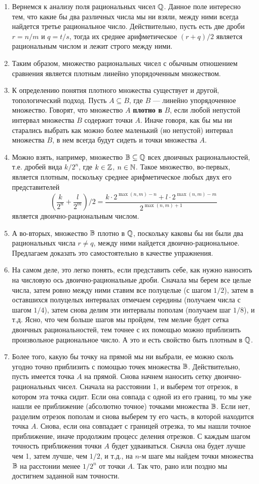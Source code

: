 \begin{enumerate}
\item Вернемся к анализу поля рациональных чисел $\mathbb Q$. Данное поле интересно тем, что какие бы два различных числа мы ни взяли, между ними всегда найдется третье рациональное число. Действительно, пусть есть две дроби $r=n/m$ и $q=t/s$, тогда их среднее арифметическое $(r+q)/2$ является рациональным числом и лежит строго между ними.
\item Таким образом, множество рациональных чисел с обычным отношением сравнения является плотным линейно упорядоченным множеством.
\item К определению понятия плотного множества существует и другой, топологический подход. Пусть $A\subseteq B$, где $B$ --- линейно упорядоченное множество. Говорят, что множество $A$ \textbf{плотно в} $B$, если любой непустой интервал множества $B$ содержит точки $A$. Иначе говоря, как бы мы ни старались выбрать как можно более маленький (но непустой) интервал множества $B$, в нем всегда будут сидеть и точки множества $A$.
\item Можно взять, например, множество $\mathbb B\subseteq\mathbb Q$ всех двоичных рациональностей, т.е. дробей вида $k/2^n$, где $k\in\mathbb Z$, $n\in\mathbb N$. Такое множество, во-первых, является плотным, поскольку среднее арифметическое любых двух его представителей
$$
\left(\frac{k}{2^n}+\frac{l}{2^m}\right)/2 = \frac{k\cdot 2^{\max(n,m)-n}+l\cdot 2^{\max(n,m)-m}}{2^{\max(n,m)+1}}
$$
является двоично-рациональным числом.
\item А во-вторых, множество $\mathbb B$ плотно в $\mathbb Q$, поскольку каковы бы ни были два рациональных числа $r\ne q$, между ними найдется двоично-рациональное. Предлагаем доказать это самостоятельно в качестве упражнения.
\item На самом деле, это легко понять, если представить себе, как нужно наносить на числовую ось двоично-рациональные дроби. Сначала мы берем все целые числа, затем ровно между ними ставим все полуцелые (с шагом $1/2$), затем в оставшихся полуцелых интервалах отмечаем середины (получаем числа с шагом $1/4$), затем снова делим эти интервалы пополам (получаем шаг $1/8$), и т.д. Ясно, что чем больше шагов мы пройдем, тем мельче будет сетка двоичных рациональностей, тем точнее с их помощью можно приблизить произвольное рациональное число. А это и есть свойство быть плотным в $\mathbb Q$.
\item Более того, какую бы точку на прямой мы ни выбрали, ее можно сколь угодно точно приблизить с помощью точек множества $\mathbb B$. Действительно, пусть имеется точка $A$ на прямой. Снова начнем наносить сетку двоично-рациональных чисел. Сначала на расстоянии 1, и выберем тот отрезок, в котором эта точка сидит. Если она совпада с одной из его границ, то мы уже нашли ее приближение (абсолютно точное) точками множества $\mathbb B$. Если нет, разделим отрезок пополам и снова выберем ту его часть, в которой находится точка $A$. Снова, если она совпадает с границей отрезка, то мы нашли точное приближение, иначе продолжим процесс деления отрезков. С каждым шагом точность приближения точки $A$ будет удваиваться. Сначла она будет лучше чем 1, затем лучше, чем $1/2$, и т.д., на $n$-м шаге мы найдем точки множества $\mathbb B$ на расстонии менее $1/2^n$ от точки $A$. Так что, рано или поздно мы достигнем заданной нам точности.

\end{enumerate}
